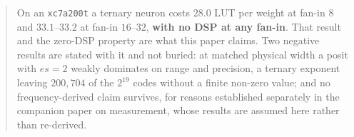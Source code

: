 \documentclass[11pt]{article}
\begin{document}
\begin{abstract}
On an \texttt{xc7a200t} a ternary neuron costs $28.0$ LUT per weight at fan-in
$8$ and $33.1$--$33.2$ at fan-in $16$--$32$, \textbf{with no DSP at any fan-in}.
That result and the zero-DSP property are what this paper claims. Two negative
results are stated with it and not buried: at matched physical width a posit
with $es=2$ weakly dominates on range and precision, a ternary exponent leaving
$200{,}704$ of the $2^{19}$ codes without a finite non-zero value; and no
frequency-derived claim survives, for reasons established separately in the
companion paper on measurement, whose results are assumed here rather than
re-derived.
\end{abstract}

\tableofcontents
\newpage




\end{document}
